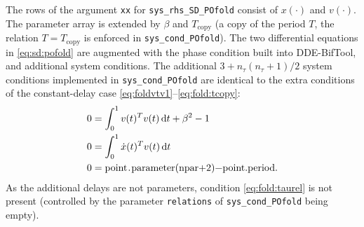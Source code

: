 \documentclass[11pt]{scrartcl}
\newcommand{\mt}[1]{\mathrm{#1}}
\renewcommand{\d}{\mathop{}\!\mathrm{d}}
\newcommand{\mlvar}[1]{\lstinline[keywordstyle=\color{var}]!#1!}
\newcommand{\blist}[1]{\mbox{\lstinline!#1!}}
\begin{document}
The rows of the argument \mlvar{xx} for \mlvar{sys_rhs_SD_POfold}
consist of $x(\cdot)$ and $v(\cdot)$. The parameter array is extended
by $\beta$ and $T_\mt{copy}$ (a copy of the period $T$, the relation
$T=T_\mt{copy}$ is enforced in \mlvar{sys_cond_POfold}). The two
differential equations in \eqref{eq:sd:pofold} are augmented with the
phase condition built into DDE-BifTool, and additional system
conditions. The additional $3+n_\tau(n_\tau+1)/2$ system conditions
implemented in \blist{sys_cond_POfold} are identical to the extra
conditions of the constant-delay case
\eqref{eq:foldvtv1}--\eqref{eq:fold:tcopy}:
\begin{align}
  \label{eq:sdfoldvtv1}
  0&=\int_0^1 v(t)^Tv(t)\d t+\beta^2-1\\
  0&=\int_0^1 \dot x(t)^Tv(t)\d t \label{eq:sdfold:phas1}\\
  0&=\blist{point.parameter(npar+2)-point.period}\mbox{.} 
  \label{eq:sdfold:tcopy}
\end{align}
As the additional delays are not parameters, condition
\eqref{eq:fold:taurel} is not present (controlled by the parameter
\mlvar{relations} of \blist{sys_cond_POfold} being empty).
\end{document}
